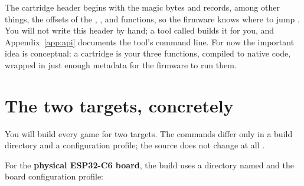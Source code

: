 \begin{center}
\label{fig:pipeline}
\end{center}

The cartridge header begins with the magic bytes  and records, among
other things, the offsets of the , , and 
functions, so the firmware knows where to jump \citep{prg32cartfmt}. You will not
write this header by hand; a tool called  builds it for you,
and Appendix~\ref{app:api} documents the tool's command line. For now the
important idea is conceptual: a cartridge is your three functions, compiled to
native code, wrapped in just enough metadata for the firmware to run them.

\section{The two targets, concretely}

You will build every game for two targets. The commands differ only in a build
directory and a configuration profile; the source does not change at all
\citep{prg32qemu}.

For the \textbf{physical ESP32\nobreakdash-C6 board}, the build uses a directory named
 and the board configuration profile:



